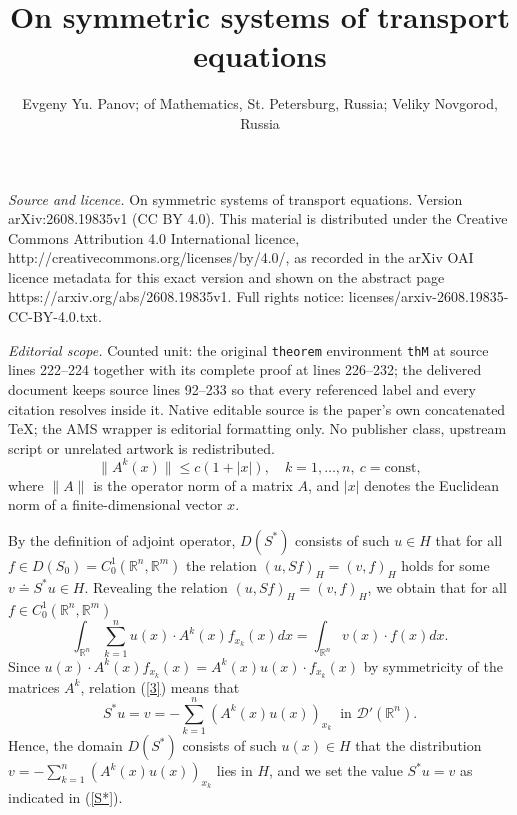 \documentclass[10pt,a4paper]{amsart}
\numberwithin{equation}{section}
\newcommand{\R}{{\mathbb R}}
\newcommand{\D}{{\mathcal D}}
\newcommand{\const}{\mathrm{const}}
\begin{document}
\title[On symmetric systems of transport equations]{On symmetric systems of transport equations}
\author{Evgeny Yu. Panov; of Mathematics, St. Petersburg, Russia; Veliky Novgorod, Russia}
\date{}
\maketitle
\noindent\emph{Source and licence.} On symmetric systems of transport equations. Version arXiv:2608.19835v1 (CC BY 4.0). This material is distributed under the Creative Commons Attribution 4.0 International licence, http://creativecommons.org/licenses/by/4.0/, as recorded in the arXiv OAI licence metadata for this exact version and shown on the abstract page https://arxiv.org/abs/2608.19835v1. Full rights notice: licenses/arxiv-2608.19835-CC-BY-4.0.txt.\par\smallskip
\noindent\textit{Editorial scope.} Counted unit: the original \texttt{theorem} environment \texttt{thM} at source lines 222--224 together with its complete proof at lines 226--232; the delivered document keeps source lines 92--233 so that every referenced label and every citation resolves inside it. Native editable source is the paper's own concatenated TeX; the AMS wrapper is editorial formatting only. No publisher class, upstream script or unrelated artwork is redistributed.
\begin{equation}\label{gr}
\|A^k(x)\|\le c(1+|x|), \quad k=1,\ldots,n, \ c=\const,
\end{equation}
where $\|A\|$ is the operator norm of a matrix $A$, and $|x|$ denotes the Euclidean norm of a finite-dimensional vector $x$.

By the definition of adjoint operator, $D(S^*)$ consists of such $u\in H$ that for all $f\in D(S_0)=C_0^1(\R^n,\R^m)$ the relation $(u,Sf)_H=(v,f)_H$ holds for some $v\doteq S^* u\in H$. Revealing the relation $(u,Sf)_H=(v,f)_H$, we obtain that
for all $f\in C_0^1(\R^n,\R^m)$
\begin{equation}\label{3}
\int_{\R^n} \sum_{k=1}^n u(x)\cdot A^k(x)f_{x_k}(x)dx=\int_{\R^n} v(x)\cdot f(x)dx.
\end{equation}
Since $u(x)\cdot A^k(x)f_{x_k}(x)=A^k(x)u(x)\cdot f_{x_k}(x)$ by symmetricity of the matrices $A^k$, relation (\ref{3}) means that
\begin{equation}\label{S*}
S^*u=v=-\sum_{k=1}^n (A^k(x)u(x))_{x_k} \ \mbox{ in } \D'(\R^n).
\end{equation}
Hence, the domain $D(S^*)$ consists of such $u(x)\in H$ that the distribution $\displaystyle v=-\sum_{k=1}^n (A^k(x)u(x))_{x_k}$ lies in $H$, and we set the value $S^*u=v$ as indicated in (\ref{S*}).
\end{document}
